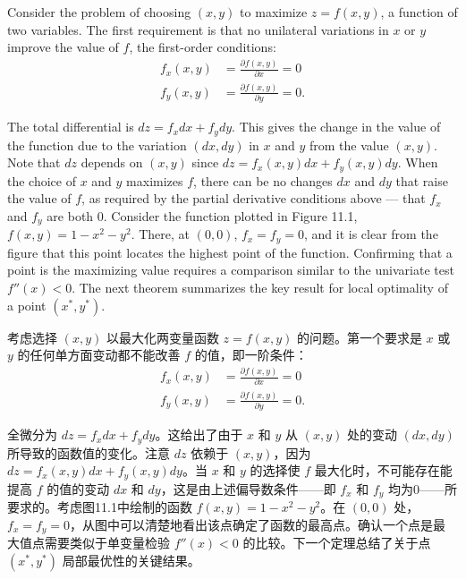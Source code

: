 \begin{original}
Consider the problem of choosing $(x, y)$ to maximize $z = f(x, y)$, a function of two variables. The first requirement is that no unilateral variations in $x$ or $y$ improve the value of $f$, the first-order conditions:
\begin{align}
f_x(x, y) &= \frac{\partial f(x, y)}{\partial x} = 0 \tag{11.1}\\
f_y(x, y) &= \frac{\partial f(x, y)}{\partial y} = 0.
\end{align}

The total differential is $dz = f_x dx + f_y dy$. This gives the change in the value of the function due to the variation $(dx, dy)$ in $x$ and $y$ from the value $(x, y)$. Note that $dz$ depends on $(x, y)$ since $dz = f_x(x, y)dx + f_y(x, y)dy$. When the choice of $x$ and $y$ maximizes $f$, there can be no changes $dx$ and $dy$ that raise the value of $f$, as required by the partial derivative conditions above --- that $f_x$ and $f_y$ are both 0. Consider the function plotted in Figure 11.1, $f(x, y) = 1 - x^2 - y^2$. There, at $(0,0)$, $f_x = f_y = 0$, and it is clear from the figure that this point locates the highest point of the function. Confirming that a point is the maximizing value requires a comparison similar to the univariate test $f''(x) < 0$. The next theorem summarizes the key result for local optimality of a point $(x^*, y^*)$.
\end{original}
\begin{translation}
考虑选择 $(x, y)$ 以最大化两变量函数 $z = f(x, y)$ 的问题。第一个要求是 $x$ 或 $y$ 的任何单方面变动都不能改善 $f$ 的值，即一阶条件：
\begin{align}
f_x(x, y) &= \frac{\partial f(x, y)}{\partial x} = 0 \tag{11.1}\\
f_y(x, y) &= \frac{\partial f(x, y)}{\partial y} = 0.
\end{align}

全微分为 $dz = f_x dx + f_y dy$。这给出了由于 $x$ 和 $y$ 从 $(x, y)$ 处的变动 $(dx, dy)$ 所导致的函数值的变化。注意 $dz$ 依赖于 $(x, y)$，因为 $dz = f_x(x, y)dx + f_y(x, y)dy$。当 $x$ 和 $y$ 的选择使 $f$ 最大化时，不可能存在能提高 $f$ 的值的变动 $dx$ 和 $dy$，这是由上述偏导数条件——即 $f_x$ 和 $f_y$ 均为0——所要求的。考虑图11.1中绘制的函数 $f(x, y) = 1 - x^2 - y^2$。在 $(0,0)$ 处，$f_x = f_y = 0$，从图中可以清楚地看出该点确定了函数的最高点。确认一个点是最大值点需要类似于单变量检验 $f''(x) < 0$ 的比较。下一个定理总结了关于点 $(x^*, y^*)$ 局部最优性的关键结果。
\end{translation}

